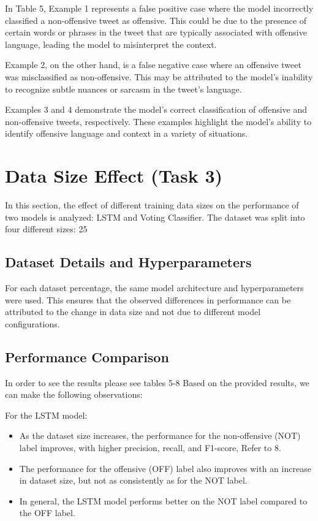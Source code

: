 \documentclass[11pt]{article}
\begin{document}
In Table 5, Example 1 represents a false positive case where the model incorrectly classified a non-offensive tweet as offensive. This could be due to the presence of certain words or phrases in the tweet that are typically associated with offensive language, leading the model to misinterpret the context.

Example 2, on the other hand, is a false negative case where an offensive tweet was misclassified as non-offensive. This may be attributed to the model's inability to recognize subtle nuances or sarcasm in the tweet's language.

Examples 3 and 4 demonstrate the model's correct classification of offensive and non-offensive tweets, respectively. These examples highlight the model's ability to identify offensive language and context in a variety of situations.



\section{Data Size Effect (Task 3)}

In this section,   the effect of different training data sizes on the performance of two models is analyzed: LSTM and Voting Classifier. The dataset was split into four different sizes: 25%

\subsection{Dataset Details and Hyperparameters}

For each dataset percentage, the same model architecture and hyperparameters were used. This ensures that the observed differences in performance can be attributed to the change in data size and not due to different model configurations.

\subsection{Performance Comparison}

In order to see the results please see tables 5-8 Based on the provided results, we can make the following observations:

For the LSTM model:
\begin{itemize}
\item As the dataset size increases, the performance for the non-offensive (NOT) label improves, with higher precision, recall, and F1-score, Refer to 8.
\item The performance for the offensive (OFF) label also improves with an increase in dataset size, but not as consistently as for the NOT label.
\item In general, the LSTM model performs better on the NOT label compared to the OFF label.
\end{itemize}
\end{document}
